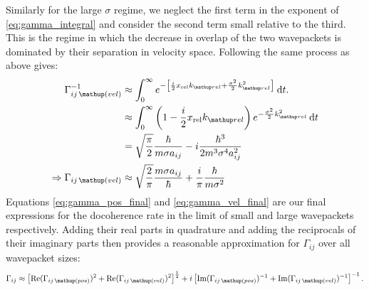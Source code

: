 Similarly for the large $\sigma$ regime, we neglect the first term in the exponent of \eqref{eq:gamma_integral} and consider the second term small relative to the third. This is the regime in which the decrease in overlap of the two wavepackets is dominated by their separation in velocity space. Following the same process as above gives:
\begin{align}
\Gamma_{ij\,\up{(vel)}}^{-1} &\approx \int_0^\infty e^{-\left[
        \frac i2 x_{\mathrm{rel}} k_\up{rel}
        + \frac{\sigma^2}{2} k_\up{rel}^2
      \right]}\, \dd t.\\
      &\approx \int_0^\infty \left(1 - \frac i2 x_{\mathrm{rel}} k_\up{rel}\right)
      e^{-\frac{\sigma^2}{2} k_\up{rel}^2}\, \dd t\\
      & = \sqrt{\frac\pi2}\frac\hbar{m \sigma a_{ij}} - i\frac{\hbar^3}{2m^3 \sigma^4 a_{ij}^2}\\
      \Rightarrow \Gamma_{ij\,\up{(vel)}} &\approx \sqrt{\frac2\pi}\frac{m \sigma a_{ij}}\hbar
                                          + \frac i\pi \frac\hbar{m \sigma^2}
                                          \label{eq:gamma_vel_final}
\end{align}
Equations \eqref{eq:gamma_pos_final} and \eqref{eq:gamma_vel_final} are our final expressions for the docoherence rate in the limit of small and large wavepackets respectively. Adding their real parts in quadrature and adding the reciprocals of their imaginary parts then provides a reasonable approximation for $\Gamma_{ij}$ over all wavepacket sizes:
\begin{align}
\Gamma_{ij} \approx
\left[\re(\Gamma_{ij\,\up{(pos)}})^2 + \re(\Gamma_{ij\,\up{(vel)}})^2\right]^{\frac12}
+ i\left[\im(\Gamma_{ij\,\up{(pos)}})^{-1} + \im(\Gamma_{ij\,\up{(vel)}})^{-1}\right]^{-1}.
\label{eq:gamma_total}
\end{align}

